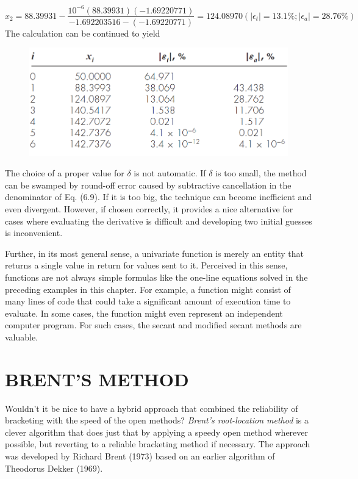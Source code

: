 \documentclass[../main.tex]{subfiles}
\begin{document}
\begin{example}
    $x_2 = 88.39931 - \dfrac{10^{-6}(88.39931)(-1.69220771)}{-1.692203516 - (-1.69220771)} =
    124.08970(\left\lvert \epsilon_t \right\rvert = 13.1\%; \left\lvert \epsilon_a \right\rvert = 28.76\%)$\\

    \noindent The calculation can be continued to yield\\

    \begin{figure}[h]
        \includegraphics[width=0.4\linewidth]{./images/example_6_5_1}
    \end{figure}
    
    The choice of a proper value for $\delta$ is not automatic. If $\delta$ is too small, the method can be
    swamped by round-off error caused by subtractive cancellation in the denominator of
    Eq. (6.9). If it is too big, the technique can become inefficient and even divergent. However,
    if chosen correctly, it provides a nice alternative for cases where evaluating the
    derivative is difficult and developing two initial guesses is inconvenient.
    
    Further, in its most general sense, a univariate function is merely an entity that returns
    a single value in return for values sent to it. Perceived in this sense, functions are not
    always simple formulas like the one-line equations solved in the preceding examples in this
    chapter. For example, a function might consist of many lines of code that could take a significant
    amount of execution time to evaluate. In some cases, the function might even represent
    an independent computer program. For such cases, the secant and modified secant
    methods are valuable.\\
\end{example}
\newpage

\section[BRENT'S METHOD]{BRENT'S METHOD}
\noindent Wouldn't it be nice to have a hybrid approach that combined the reliability of bracketing
with the speed of the open methods? \emph{Brent's root-location method} is a clever algorithm that
does just that by applying a speedy open method wherever possible, but reverting to a reliable
bracketing method if necessary. The approach was developed by Richard Brent (1973)
based on an earlier algorithm of Theodorus Dekker (1969).
\end{document}
